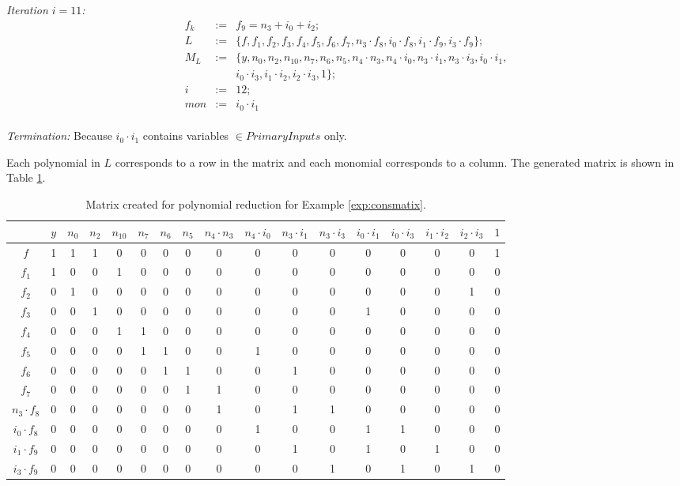 \begin{Example}
	{\it Iteration $i=11$:}
	\begin{eqnarray}
		f_{k}&:=&f_{9}=n_3+i_0+i_2; \nonumber \\
		L&:=&\{ f,f_1,f_{2},f_{3},f_{4},f_{5},f_{6},f_{7},n_3 \cdot f_{8}, i_{0} \cdot f_{8},i_1 \cdot f_{9}, i_3 \cdot f_{9}\}; \nonumber \\
		M_{L}&:=&\{ y,n_0,n_2,n_{10},n_7,n_6,n_5,n_4\cdot n_3,n_4\cdot i_0, n_3\cdot i_1,n_3\cdot i_3,i_0\cdot i_1,\nonumber \\
		&{}&i_0\cdot i_3, i_1\cdot i_2,i_2\cdot i_3,1\}; \nonumber \\
		i&:=&12;  \nonumber \\
		mon&:=& i_0\cdot i_1 \nonumber 
	\end{eqnarray}\\
	
	{\it Termination:} Because $i_0\cdot i_1$ contains variables
        $\in PrimaryInputs$ only.
	
	Each polynomial in $L$ corresponds to a row in the matrix and
        each monomial corresponds to a column. The generated matrix is
        shown in Table \ref{tab:matrixcons}. 
	
	\begin{table} 
	\begin{center}
	\caption{Matrix created for polynomial reduction for Example \ref{exp:consmatix}.} 
	\label{tab:matrixcons}
	\begin{tabular}{|c||c|c|c|c|c|c|c|c|c|c|c|c|c|c|c|c|} \hline 
				&$y$ 	&$n_0$ &$n_2$	&$n_{10}$	 &$n_7$	&$n_6$  &$n_5$   &$n_4\cdot n_3$  &$n_4\cdot i_0$ 	&$n_3\cdot i_1$	&$n_3\cdot i_3$	&$i_0\cdot i_1$		&$i_0\cdot i_3$ 	&$i_1\cdot i_2$	 &$i_2\cdot i_3$   &$1$ \\
		\hline
		$f$   		&1	&1	&1	&0		&0	&0	&0	&0	&0	&0	&0	&0	&0	&0	&0	&1 \\
		\hline
		$f_1$ 		&1	&0	&0	&1		&0	&0	&0	&0	&0	&0	&0	&0	&0	&0	&0	&0 \\
		\hline
		$f_2$ 		&0	&1	&0	&0		&0	&0	&0	&0	&0	&0	&0	&0	&0	&0	&1	&0 \\
		\hline
		$f_3$		&0	&0	&1	&0		&0	&0	&0	&0	&0	&0	&0	&1	&0	&0	&0	&0 \\
		\hline
		$f_4$		&0	&0	&0	&1		&1	&0	&0	&0	&0	&0	&0	&0	&0	&0	&0	&0\\
		\hline{}
		$f_5$		&0	&0	&0	&0		&1	&1	&0	&0	&1	&0	&0	&0	&0	&0	&0	&0\\
		\hline{}
		$f_6$		&0	&0	&0	&0		&0	&1	&1	&0	&0	&1	&0	&0	&0	&0	&0	&0\\
		\hline{}
		$f_7$		&0	&0	&0	&0		&0	&0	&1	&1	&0	&0	&0	&0	&0	&0	&0	&0\\
	\hline{}
$n_3\cdot f_{8}$	&0	&0	&0	&0		&0	&0	&0	&1	&0	&1	&1	&0	&0	&0	&0	&0\\
	\hline{}
$i_0\cdot f_{8}$ 	&0	&0	&0	&0		&0	&0	&0	&0	&1	&0	&0	&1	&1	&0	&0	&0\\
	\hline{}
$i_1 \cdot f_{9}$	&0	&0	&0	&0		&0	&0	&0	&0	&0	&1	&0	&1	&0	&1	&0	&0\\
	\hline{}
$i_3 \cdot f_{9}$	&0	&0	&0	&0		&0	&0	&0	&0	&0	&0	&1	&0	&1	&0	&1	&0\\
	\hline
	\end{tabular}
	\end{center}
	\end{table} 
	

\end{Example}
